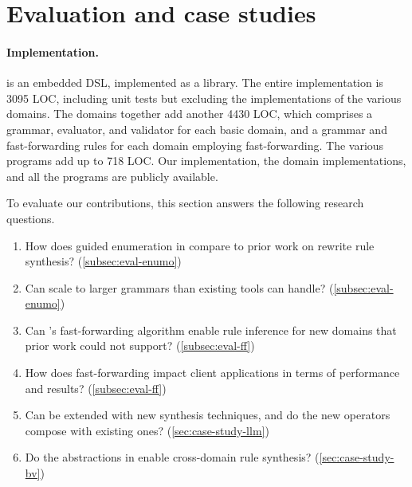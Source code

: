 \section{Evaluation and case studies}
\label{sec:eval}

\paragraph*{Implementation.}
\enumo is an embedded DSL,
  implemented as a \rust library.
The entire implementation
  is 3095 LOC, including unit tests but excluding
  the implementations of the various domains.
The domains together add another 4430 LOC,
 which comprises a grammar, evaluator, and validator for
 each basic domain,
 and a grammar and fast-forwarding rules for
 each domain employing fast-forwarding.
The various \enumo programs add up to 718 LOC.
Our \enumo implementation, the domain implementations, and all the \enumo programs
  are publicly available.

To evaluate our contributions,
  this section answers the following
  research questions.

\begin{enumerate}

\item How does guided enumeration in \enumo
  compare to prior work on rewrite rule synthesis?
  (\autoref{subsec:eval-enumo})

\item Can \enumo scale to larger grammars than
  existing tools can handle?
  (\autoref{subsec:eval-enumo})

\item Can \enumo's fast-forwarding algorithm enable rule
  inference for new domains that prior work could not support?
  (\autoref{subsec:eval-ff})

\item How does fast-forwarding impact client applications
    in terms of performance and results?
    (\autoref{subsec:eval-ff})

\item Can \enumo be extended with new synthesis techniques,
    and do the new operators compose with existing ones?
    (\autoref{sec:case-study-llm})
\item Do the abstractions in \enumo
    enable cross-domain rule synthesis?
    (\autoref{sec:case-study-bv})

\end{enumerate}







